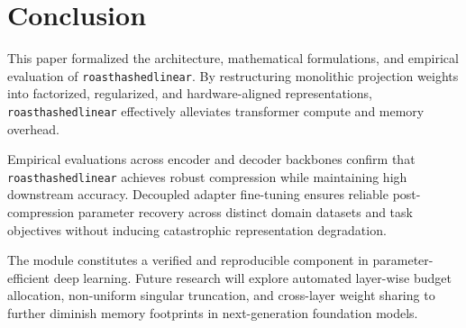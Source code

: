 \section{Conclusion}
This paper formalized the architecture, mathematical formulations, and empirical evaluation of \texttt{roasthashedlinear}. By restructuring monolithic projection weights into factorized, regularized, and hardware-aligned representations, \texttt{roasthashedlinear} effectively alleviates transformer compute and memory overhead.

Empirical evaluations across encoder and decoder backbones confirm that \texttt{roasthashedlinear} achieves robust compression while maintaining high downstream accuracy. Decoupled adapter fine-tuning ensures reliable post-compression parameter recovery across distinct domain datasets and task objectives without inducing catastrophic representation degradation.

The module constitutes a verified and reproducible component in parameter-efficient deep learning. Future research will explore automated layer-wise budget allocation, non-uniform singular truncation, and cross-layer weight sharing to further diminish memory footprints in next-generation foundation models.

